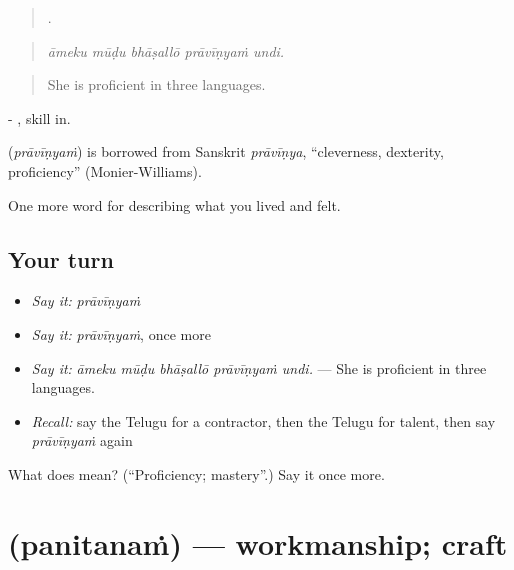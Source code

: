 \begin{quote}
    .
\end{quote}

\begin{quote}
\emph{āmeku mūḍu bhāṣallō prāvīṇyaṁ undi.}
\end{quote}

\begin{quote}
She is proficient in three languages.
\end{quote}

- , skill in.

\begin{cousinweb}
\textbf{} (\emph{prāvīṇyaṁ}) is borrowed from Sanskrit \emph{prāvīṇya}, \textquotedblleft{}cleverness, dexterity, proficiency\textquotedblright{} (Monier-Williams).
\end{cousinweb}

\begin{grammarlens}[title={What you've built}]
One more word for describing what you lived and felt.
\end{grammarlens}

\subsection*{Your turn}
\begin{itemize}
\raggedright
  \item \emph{Say it:} \emph{prāvīṇyaṁ}
  \item \emph{Say it:} \emph{prāvīṇyaṁ}, once more
  \item \emph{Say it:} \emph{āmeku mūḍu bhāṣallō prāvīṇyaṁ undi.} — She is proficient in three languages.
  \item \emph{Recall:} say the Telugu for a contractor, then the Telugu for talent, then say \emph{prāvīṇyaṁ} again
\end{itemize}

\begin{tcolorbox}[breakable,colback=teal!4,colframe=teal!35!black,title={Before you move on}]
What does  mean? (\textquotedblleft{}Proficiency; mastery\textquotedblright{}.) Say it once more.
\end{tcolorbox}
\section[\texorpdfstring{\te{పనితనం} (panitanaṁ)}{పనితనం (panitanaṁ)}]{ (panitanaṁ) — workmanship; craft}

